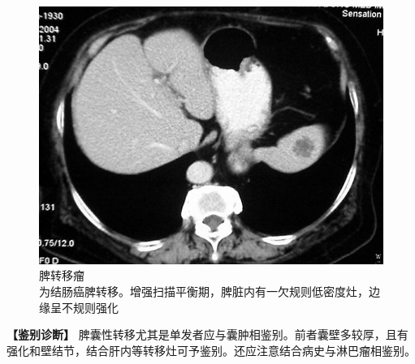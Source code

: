 \begin{figure}[!htbp]
 \centering
 \includegraphics[width=.7\textwidth,height=\textheight,keepaspectratio]{./images/Image00315.jpg}
 \captionsetup{justification=centering}
 \caption{脾转移瘤\\{\small 为结肠癌脾转移。增强扫描平衡期，脾脏内有一欠规则低密度灶，边缘呈不规则强化}}
 \label{fig14-7}
  \end{figure} 

\textbf{【鉴别诊断】}
脾囊性转移尤其是单发者应与囊肿相鉴别。前者囊壁多较厚，且有强化和壁结节，结合肝内等转移灶可予鉴别。还应注意结合病史与淋巴瘤相鉴别。

\protect\hypertarget{text00022.html}{}{}

